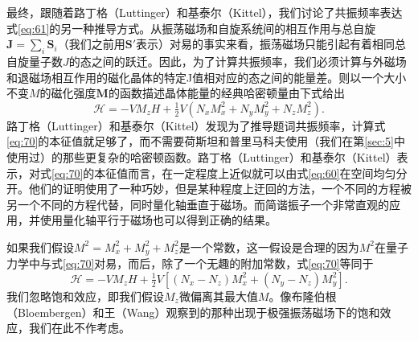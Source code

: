 \documentclass{article}
\begin{document}
最终，跟随着路丁格（Luttinger）和基泰尔（Kittel），我们讨论了共振频率表达式\eqref{eq:61}的另一种推导方式。从振荡磁场和自旋系统间的相互作用与总自旋$\mathbf{J}=\sum_i\mathbf{S}_i$（我们之前用$\mathbf{S}'$表示）对易的事实来看，振荡磁场只能引起有着相同总自旋量子数$J$的态之间的跃迁。因此，为了计算共振频率，我们必须计算与外磁场和退磁场相互作用的磁化晶体的特定J值相对应的态之间的能量差。则以一个大小不变$M$的磁化强度$\mathbf{M}$的函数描述晶体能量的经典哈密顿量由下式给出
\begin{equation} \label{eq:70}
\mathcal{H}=-VM_zH+\tfrac{1}{2}V(N_xM_x^2+N_yM_y^2+N_zM_z^2).
\end{equation}
路丁格（Luttinger）和基泰尔（Kittel）发现为了推导题词共振频率，计算式\eqref{eq:70}的本征值就足够了，而不需要荷斯坦和普里马科夫使用（我们在第\ref{sec:5}中使用过）的那些更复杂的哈密顿函数。路丁格（Luttinger）和基泰尔（Kittel）表示，对式\eqref{eq:70}的本征值而言，在一定程度上近似就可以由式\eqref{eq:60}在空间均匀分开。他们的证明使用了一种巧妙，但是某种程度上迂回的方法，一个不同的方程被另一个不同的方程代替，同时量化轴垂直于磁场。而简谐振子一个非常直观的应用，并使用量化轴平行于磁场也可以得到正确的结果。

如果我们假设$M^2=M_x^2+M_y^2+M_z^2$是一个常数，这一假设是合理的因为$M^2$在量子力学中与式\eqref{eq:70}对易，而后，除了一个无趣的附加常数，式\eqref{eq:70}等同于
\begin{equation} \label{eq:71}
\mathcal{H}=-VM_zH+\tfrac{1}{2}V[(N_x-N_z)M_x^2+(N_y-N_z)M_y^2].
\end{equation}
我们忽略饱和效应，即我们假设$M_z$微偏离其最大值$M$。像布隆伯根（Bloembergen）和王（Wang）观察到的那种出现于极强振荡磁场下的饱和效应，我们在此不作考虑。
\end{document}
